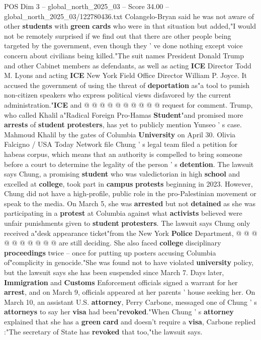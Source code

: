 \begin{textsample}{POS Dim 3 – global\_north\_2025\_03 – Score 34.00 – global\_north\_2025\_03/122780436.txt}
Colangelo-Bryan said he was not aware of other \textbf{students} with \textbf{green} \textbf{cards} who were in that situation but added,"I would not be remotely surprised if we find out that there are other people being targeted by the government, even though they ' ve done nothing except voice concern about civilians being killed."The suit names President Donald Trump and other Cabinet members as defendants, as well as acting \textbf{ICE} Director Todd M.
Lyons and acting \textbf{ICE} New York Field Office Director William P.
Joyce.
It accused the government of using the threat of \textbf{deportation} as"a tool to punish non-citizen speakers who express political views disfavored by the current administration."\textbf{ICE} and @ @ @ @ @ @ @ @ @ @ request for comment.
Trump, who called Khalil a"Radical Foreign Pro-Hamas \textbf{Student}"and promised more \textbf{arrests} of \textbf{student} \textbf{protesters}, has yet to publicly mention Yunseo ' s case.
Mahmoud Khalil by the gates of Columbia \textbf{University} on April 30.
Olivia Falcigno / USA Today Network file Chung ' s legal team filed a petition for habeas corpus, which means that an authority is compelled to bring someone before a court to determine the legality of the person ' s \textbf{detention}.
The lawsuit says Chung, a promising \textbf{student} who was valedictorian in high \textbf{school} and excelled at \textbf{college}, took part in \textbf{campus} \textbf{protests} beginning in 2023.
However, Chung did not have a high-profile, public role in the pro-Palestinian movement or speak to the media.
On March 5, she was \textbf{arrested} but not \textbf{detained} as she was participating in a \textbf{protest} at Columbia against what \textbf{activists} believed were unfair punishments given to \textbf{student} \textbf{protesters}.
The lawsuit says Chung only received a"desk appearance ticket"from the New York \textbf{Police} Department, @ @ @ @ @ @ @ @ @ @ are still deciding.
She also faced \textbf{college} disciplinary \textbf{proceedings} twice -- once for putting up posters accusing Columbia of"complicity in genocide."She was found not to have violated \textbf{university} policy, but the lawsuit says she has been suspended since March 7.
Days later, \textbf{Immigration} and \textbf{Customs} Enforcement officials signed a warrant for her \textbf{arrest}, and on March 9, officials appeared at her parents ' house seeking her.
On March 10, an assistant U.S. \textbf{attorney}, Perry Carbone, messaged one of Chung ' s \textbf{attorneys} to say her \textbf{visa} had been"\textbf{revoked}."When Chung ' s \textbf{attorney} explained that she has a \textbf{green} \textbf{card} and doesn't require a \textbf{visa}, Carbone replied :"The secretary of State has \textbf{revoked} that too,"the lawsuit says.

\end{textsample}
